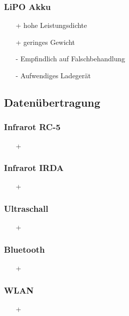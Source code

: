 \subsubsection{LiPO Akku}
\begin{itemize}
    \item[+] hohe Leistungsdichte
    \item[+] geringes Gewicht
    \item[-] Empfindlich auf Falschbehandlung
    \item[-] Aufwendiges Ladegerät
\end{itemize}

\subsection{Datenübertragung}

\subsubsection{Infrarot RC-5}
\begin{itemize}
    \item[+] ~
\end{itemize}

\subsubsection{Infrarot IRDA}
\begin{itemize}
    \item[+] ~
\end{itemize}

\subsubsection{Ultraschall}
\begin{itemize}
    \item[+] ~
\end{itemize}

\subsubsection{Bluetooth}
\begin{itemize}
    \item[+] ~
\end{itemize}

\subsubsection{WLAN}
\begin{itemize}
    \item[+] ~
\end{itemize}

